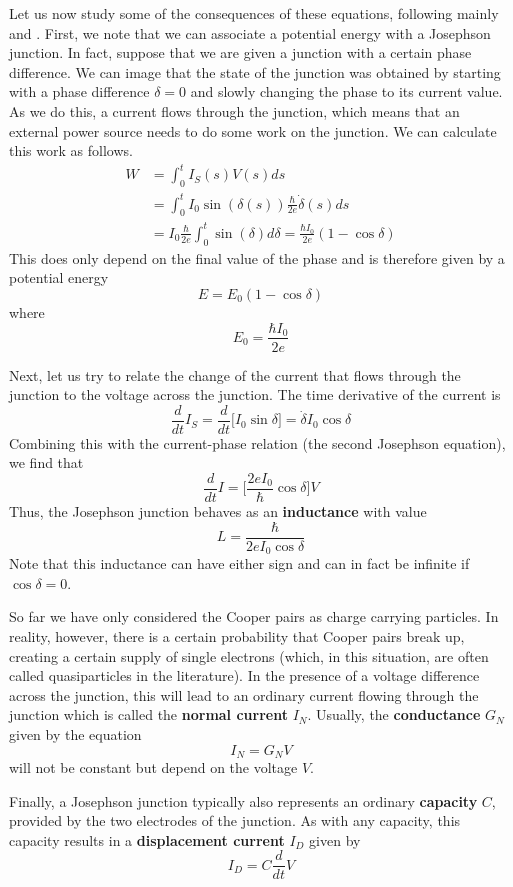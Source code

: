 \documentclass[a4paper, draft]{article}
\theoremstyle{own}
\theoremstyle{remark}
\begin{document}
Let us now study some of the consequences of these equations, following mainly \cite{Likharev} and \cite{GrossMarxLectureNotes}. 
First, we note that we can associate a potential energy with a Josephson junction. In fact, suppose that we are given a junction with a certain phase difference. We can image that the state of the junction was obtained by starting with a phase difference $\delta=0$ and slowly changing the phase to its current value. As we do this, a current flows through the junction, which means that an external power source needs to do some work on the junction. We can calculate this work as follows.
\begin{align*}
W &= \int_0^t I_S(s) V(s) ds 
\\ &= 
 \int_0^t I_0 \sin(\delta(s)) \frac{\hbar}{2e} \dot{\delta}(s) ds
\\ & =
 I_0\frac{\hbar}{2e} \int_0^t \sin(\delta) d\delta 
 = \frac{\hbar I_0}{2e} (1 - \cos \delta)  
\end{align*}
This does only depend on the final value of the phase and is therefore given by a potential energy
$$
E = E_0 (1 - \cos \delta)
$$
where
$$
E_0 = \frac{\hbar I_0}{2e}
$$

Next, let us try to relate the change of the current that flows through the junction to the voltage across the junction. The time derivative of the current is
$$
\frac{d}{dt} I_S = \frac{d}{dt} \big[ I_0 \sin \delta \big] 
=
\dot{\delta} I_0 \cos \delta
$$
Combining this with the current-phase relation (the second Josephson equation), we find that
$$
\frac{d}{dt} I = \big[ \frac{2eI_0}{\hbar} \cos \delta \big] V
$$
Thus, the Josephson junction behaves as an {\bf inductance} with value
$$
L = \frac{\hbar}{2e I_0 \cos \delta}
$$
Note that this inductance can have either sign and can in fact be infinite if $\cos \delta = 0$.

So far we have only considered the Cooper pairs as charge carrying particles. In reality, however, there is a certain probability that Cooper pairs break up, creating a certain supply of single electrons (which, in this situation, are often called quasiparticles in the literature). In the presence of a voltage difference across the junction, this will lead to an ordinary current flowing through the junction which is called the {\bf normal current} $I_N$. Usually, the {\bf conductance} $G_N$ given by the equation
$$
I_N = G_N V
$$
will not be constant but depend on the voltage $V$. 

Finally, a Josephson junction typically also represents an ordinary {\bf capacity} $C$, provided by the two electrodes of the junction. As with any capacity, this capacity results in a {\bf displacement current} $I_D$ given by
$$
I_D = C \frac{d}{dt} V
$$
\end{document}
